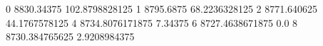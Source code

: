 0 8830.34375 102.8798828125
1 8795.6875 68.2236328125
2 8771.640625 44.1767578125
4 8734.8076171875 7.34375
6 8727.4638671875 0.0
8 8730.384765625 2.9208984375
